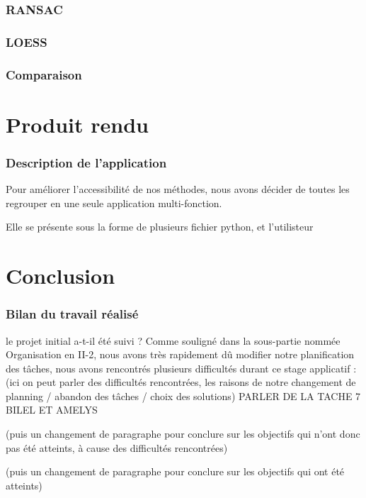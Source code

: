 \documentclass[a4paper,12pt]{article} %
\begin{document}
            
    \section{RANSAC}
    \section{LOESS}
    \section{Comparaison}
    
      
    
    
\renewcommand\partname{}
\part{Produit rendu}

\section{Description de l'application}

Pour améliorer l'accessibilité de nos méthodes, nous avons décider de toutes les regrouper en une seule application multi-fonction.

Elle se présente sous la forme de plusieurs fichier python, et l'utilisteur 

\renewcommand\partname{}
\part{Conclusion}
	\section{Bilan du travail réalisé}
    le projet initial a-t-il été suivi ?
    Comme souligné dans la sous-partie nommée Organisation en II-2, nous avons très rapidement dû modifier notre planification des tâches, nous avons rencontrés plusieurs difficultés durant ce stage applicatif :
    (ici on peut parler des difficultés rencontrées, les raisons de notre changement de planning / abandon des tâches / choix des solutions)
    PARLER DE LA TACHE 7 BILEL ET AMELYS
    
    (puis un changement de paragraphe pour conclure sur les objectifs qui n'ont donc pas été atteints, à cause des difficultés rencontrées)
    
    (puis un changement de paragraphe pour conclure sur les objectifs qui ont été atteints)
    
\end{document}
